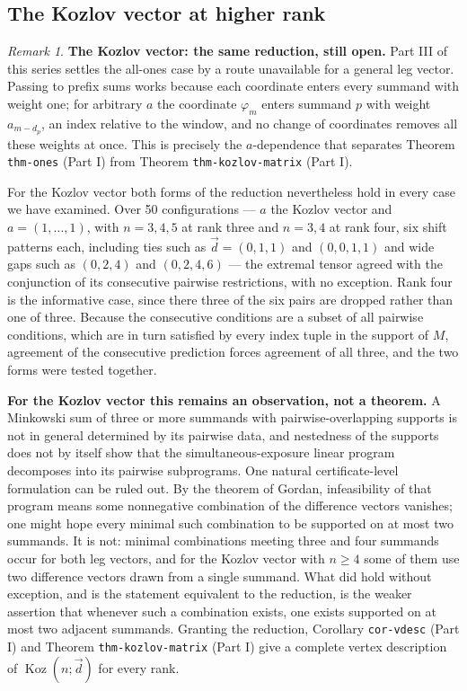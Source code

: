\documentclass[11pt, a4paper, abstract=yes]{scrartcl}
\theoremstyle{definition}
\theoremstyle{remark}
\newtheorem{remark}[definition]{Remark}
\theoremstyle{plain}
\newcommand{\Koz}{\operatorname{Koz}}
\begin{document}
\subsection{The Kozlov vector at higher rank}
\label{sec:org4369fff}
\begin{remark}
\textbf{The Kozlov vector: the same reduction, still open.} Part III of this series settles the
all-ones case by a route unavailable for a general leg vector. Passing to prefix sums works because
each coordinate enters every summand with weight one; for arbitrary \(a\) the coordinate
\(\varphi_m\) enters summand \(p\) with weight \(a_{m-d_p}\), an index relative to the window, and no
change of coordinates removes all these weights at once. This is precisely the \(a\)-dependence that
separates Theorem \texttt{thm-ones} (Part I) from Theorem \texttt{thm-kozlov-matrix} (Part I).

For the Kozlov vector both forms of the reduction nevertheless hold in every case we have examined.
Over 50 configurations --- \(a\) the Kozlov vector and \(a=(1,\dots,1)\), with \(n=3,4,5\) at rank
three and \(n=3,4\) at rank four, six shift patterns each, including ties such as
\(\vec d=(0,1,1)\) and \((0,0,1,1)\) and wide gaps such as \((0,2,4)\) and \((0,2,4,6)\) --- the
extremal tensor agreed with the conjunction of its consecutive pairwise restrictions, with no
exception. Rank four is the informative case, since there three of the six pairs are dropped rather
than one of three. Because the consecutive conditions are a subset of all pairwise conditions, which
are in turn satisfied by every index tuple in the support of \(M\), agreement of the consecutive
prediction forces agreement of all three, and the two forms were tested together.

\textbf{For the Kozlov vector this remains an observation, not a theorem.} A Minkowski sum of three or more
summands with pairwise-overlapping supports is not in general determined by its pairwise data, and
nestedness of the supports does not by itself show that the simultaneous-exposure linear program
decomposes into its pairwise subprograms. One natural certificate-level formulation can be ruled
out. By the theorem of Gordan, infeasibility of that program means some nonnegative combination of
the difference vectors vanishes; one might hope every minimal such combination to be supported on at
most two summands. It is not: minimal combinations meeting three and four summands occur for both
leg vectors, and for the Kozlov vector with \(n\ge4\) some of them use two difference vectors drawn
from a single summand. What did hold without exception, and is the statement equivalent to the
reduction, is the weaker assertion that whenever such a combination exists, one exists supported on
at most two adjacent summands. Granting the reduction, Corollary \texttt{cor-vdesc} (Part I) and Theorem
\texttt{thm-kozlov-matrix} (Part I) give a complete vertex description of \(\Koz(n;\vec d)\) for every rank.
\label{orgeb680f6}
\end{remark}
\end{document}
